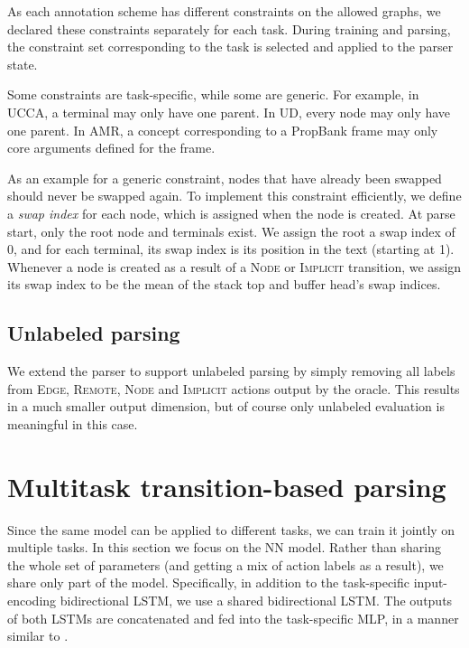 \documentclass[11pt,a4paper]{article}
\begin{document}
As each annotation scheme has different constraints on the allowed graphs,
we declared these constraints separately for each task.
During training and parsing, the constraint set corresponding to the task is
selected and applied to the parser state.

Some constraints are task-specific, while some are generic.
For example, in UCCA, a terminal may only have one parent.
In UD, every node may only have one parent.
In AMR, a concept corresponding to a PropBank frame may only core arguments defined for the frame.

As an example for a generic constraint, nodes that have already been swapped
should never be swapped again.
To implement this constraint efficiently, we define a \textit{swap index}
for each node, which is assigned when the node is created.
At parse start, only the root node and terminals exist.
We assign the root a swap index of 0, and for each terminal, its swap index
is its position in the text (starting at 1).
Whenever a node is created as a result of a \textsc{Node} or \textsc{Implicit}
transition, we assign its swap index to be the mean of the stack top and buffer
head's swap indices.


\subsection{Unlabeled parsing}\label{sec:unlabeled}

We extend the parser to support unlabeled parsing by simply removing all labels from
\textsc{Edge}, \textsc{Remote}, \textsc{Node} and \textsc{Implicit} actions output by the oracle.
This results in a much smaller output dimension, but of course only unlabeled evaluation is
meaningful in this case.



\section{Multitask transition-based parsing}\label{sec:multitask}

Since the same model can be applied to different tasks, we can train it jointly on multiple tasks.
In this section we focus on the NN model.
Rather than sharing the whole set of parameters (and getting a mix of action labels as a result),
we share only part of the model.
Specifically, in addition to the task-specific input-encoding bidirectional LSTM,
we use a shared bidirectional LSTM. The outputs of both LSTMs are concatenated and
fed into the task-specific MLP, in a manner similar to \citet{P17-1186}.
\end{document}
